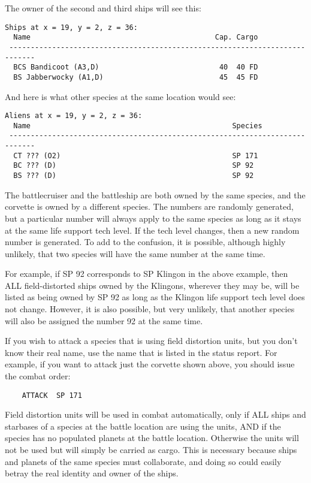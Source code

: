 \documentclass[10pt,titlepage]{article}
\begin{document}
The owner of the second and third ships will see this:

\begin{verbatim}
Ships at x = 19, y = 2, z = 36:
  Name                                           Cap. Cargo
 ----------------------------------------------------------------------------
  BCS Bandicoot (A3,D)                            40  40 FD
  BS Jabberwocky (A1,D)                           45  45 FD\end{verbatim} 


And here is what other species at the same location would see:

\begin{verbatim}
Aliens at x = 19, y = 2, z = 36:
  Name                                               Species
 ----------------------------------------------------------------------------
  CT ??? (O2)                                        SP 171
  BC ??? (D)                                         SP 92
  BS ??? (D)                                         SP 92\end{verbatim} 


The battlecruiser and the battleship are both owned by the same species,
and the corvette is owned by a different species.  The numbers are randomly
generated, but a particular number will always apply to the same species as
long as it stays at the same life support tech level.  If the tech level
changes, then a new random number is generated.  To add to the confusion,
it is possible, although highly unlikely, that two species will have the
same number at the same time.

For example, if SP 92 corresponds to SP Klingon in the above example, then
ALL field-distorted ships owned by the Klingons, wherever they may be, will be
listed as being owned by SP 92 as long as the Klingon life support tech level
does not change.  However, it is also possible, but very unlikely, that another
species will also be assigned the number 92 at the same time.

If you wish to attack a species that is using field distortion units, but you
don't know their real name, use the name that is listed in the status report.
For example, if you want to attack just the corvette shown above, you should
issue the combat order:

\begin{verbatim}
	ATTACK	SP 171\end{verbatim} 

Field distortion units will be used in combat automatically, only if ALL ships
and starbases of a species at the battle location are using the units, AND if
the species has no populated planets at the battle location.  Otherwise the
units will not be used but will simply be carried as cargo.  This is necessary
because ships and planets of the same species must collaborate, and doing so
could easily betray the real identity and owner of the ships.
\end{document}
